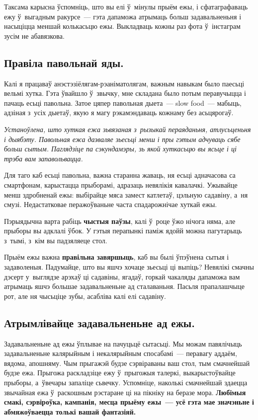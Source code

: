Таксама карысна ўспомніць, што вы елі ў~мінулы прыём ежы, і сфатаграфаваць ежу ў~выгадным ракурсе~--- гэта дапаможа атрымаць больш задавальненьня і насыціцца меншай колькасьцю ежы. Выкладваць кожны раз фота ў~інстаграм зусім не абавязкова.


\subsection*{Правіла павольнай яды.}
Калі я працаваў анэстэзіёлягам-рэаніматолягам, важным навыкам было паесьці вельмі хутка. Гэта ўвайшло ў~звычку, мне складана было потым перавучыцца і пачаць есьці павольна. Затое цяпер павольная дыета~--- slow food~--- мабыць, адзіная з~усіх дыетаў, якую я магу рэкамэндаваць кожнаму без асьцярогаў.

\emph{Устаноўлена, што хуткая ежа зьвязаная з~рызыкай пераяданьня, атлусьценьня і дыябэту. Павольная ежа дазваляе зьесьці менш і пры гэтым адчуваць сябе больш сытым. Паглядзіце па сэкундамэры, зь якой хуткасьцю вы ясьце і ці трэба вам запавольвацца.}

Для таго каб есьці павольна, важна старанна жаваць, ня есьці адначасова са смартфонам, карыстацца прыборамі, адразаць невялікія кавалачкі. Ужывайце менш здробненай ежы: выбірайце мяса замест катлетаў, цэльную садавіну, а~ня смузі. Недастатковае перажоўваньне часта спадарожнічае хуткай ежы.

Пэрыядычна варта рабіць \textbf{чыстыя паўзы}, калі ў~роце ўжо нічога няма, але прыборы вы адклалі ўбок. У гэтыя перапынкі паміж ядойй можна пагутарыць з~тымі, з~кім вы падзяляеце стол.

Прыём ежы важна \textbf{правільна завяршыць}, каб вы былі ўпэўнена сытыя і задаволеныя. Падумайце, што вы яшчэ хочаце зьесьці ці выпіць? Невялікі смачны дэсерт у~выглядзе арэхаў ці садавіны, ягадаў, горкай чакаляды дапаможа вам атрымаць яшчэ большае задавальненьне ад сталаваньня. Пасьля прапалашчыце рот, але ня чысьціце зубы, асабліва калі елі садавіну.

\subsection*{Атрымлівайце задавальненьне ад ежы.}
Задавальненьне ад ежы ўплывае на пачуцьцё сытасьці. Мы можам павялічыць задавальненьне калярыйным і некалярыйным спосабамі~--- перавагу аддаём, вядома, апошняму. Чым прыгажэй будзе сэрвіраваны ваш стол, тым смачнейшай будзе ежа. Прыгожа раскладзіце ежу ў~прыгожыя талеркі, выкарыстоўвайце прыборы, а~ўвечары запаліце сьвечку. Успомніце, наколькі смачнейшай здаецца звычайная ежа ў~раскошным рэстаране ці на пікніку на беразе мора. \textbf{Любімыя смакі, сэрвіроўка, кампанія, месца прыёму ежы~--- усё гэта мае значэньне і абмяжоўваецца толькі вашай фантазіяй.}

